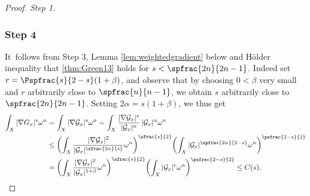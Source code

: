 \begin{proof}[Proof. Step 1]
\subsubsection*{Step 4}
It~follows from Step 3, Lemma \ref{lem:weightedgradient} below and Hölder inequality
that \eqref{thm:Green13} holds for $s<\spfrac{2n}{2n-1}$.
Indeed set $r=\Pspfrac{s}{2-s}(1+\beta)$, and observe that
by choosing $0<\beta$ very small and $r$ arbitrarily close to $\spfrac{n}{n-1}$,
we obtain $s$ arbitrarily close to $\spfrac{2n}{2n-1}$.
Setting $2\alpha=s(1+\beta)$, we thus get
\begin{align*}
\int_X |\nabla {G}_x|^s {\omega^n}&=
\int_X |\nabla {\mathcal G}_x|^s {\omega^n}
= \int_X \frac{|\nabla {\mathcal G}_x|^s}{|{\mathcal G}_x|^{\alpha}}\, |{\mathcal G}_x|^{\alpha} {\omega^n} \\
&\leq  \left( \int_X \frac{|\nabla {\mathcal G}_x|^2}{{|{\mathcal G}_x}|^{\sfrac{2\alpha}{s}}} {\omega^n} \right)^{\sfrac{s}{2}}
\!\left( \int_X |{\mathcal G}_x|^{\spfrac{2\alpha}{2-s}} {\omega^n} \right)^{\psfrac{2-s}{2}} \\
&= \left( \int_X \frac{|\nabla {\mathcal G}_x|^2}{{|{\mathcal G}_x}|^{1+\beta}} {\omega^n} \right)^{\sfrac{s}{2}}
\!\left( \int_X |{\mathcal G}_x|^{r} {\omega^n} \right)^{\psfrac{2-s}{2}} \leq C(s).\qedhere
\end{align*}
\end{proof}

